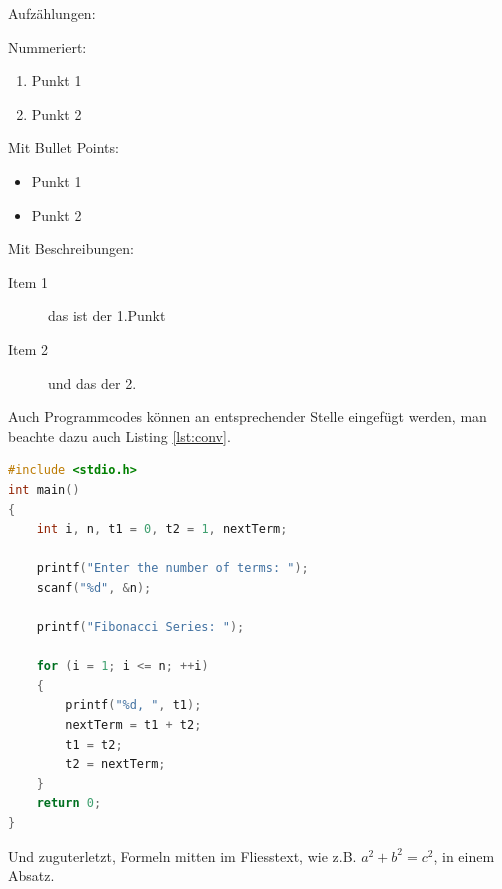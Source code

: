 Aufzählungen:

Nummeriert:

\begin{enumerate}
	\item Punkt 1
	\item Punkt 2
\end{enumerate}

Mit Bullet Points:

\begin{itemize}
	\item Punkt 1
	\item Punkt 2
\end{itemize}

Mit Beschreibungen:

\begin{description}
	\item[Item 1] das ist der 1.Punkt
	\item[Item 2] und das der 2.
\end{description}


Auch Programmcodes können an entsprechender Stelle eingefügt werden, man beachte dazu auch Listing \ref{lst:conv}.


\begin{lstlisting}[frame=lines, caption=Simple Listing, captionpos=b, label = lst:conv, language=C, showstringspaces=false]
#include <stdio.h>
int main()
{
	int i, n, t1 = 0, t2 = 1, nextTerm;

	printf("Enter the number of terms: ");
	scanf("%d", &n);

	printf("Fibonacci Series: ");

	for (i = 1; i <= n; ++i)
	{
		printf("%d, ", t1);
		nextTerm = t1 + t2;
		t1 = t2;
		t2 = nextTerm;
	}
	return 0;
}
\end{lstlisting}

Und zuguterletzt, Formeln mitten im Fliesstext, wie z.B. $a^2+b^2=c^2$, in einem Absatz.
